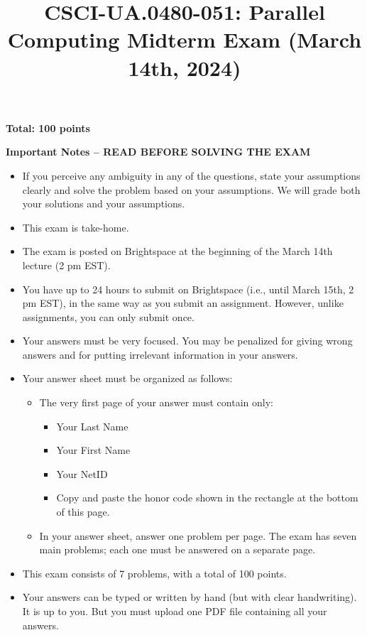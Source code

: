 \documentclass{article}
\title{CSCI-UA.0480-051: Parallel Computing Midterm Exam (March 14th, 2024)}
\author{}
\date{}
\begin{document}
\maketitle

\textbf{Total: 100 points}

\textbf{Important Notes -- READ BEFORE SOLVING THE EXAM}

\begin{itemize}
    \item If you perceive any ambiguity in any of the questions, state your assumptions clearly and solve the problem based on your assumptions. We will grade both your solutions and your assumptions.
    \item This exam is take-home.
    \item The exam is posted on Brightspace at the beginning of the March 14th lecture (2 pm EST).
    \item You have up to 24 hours to submit on Brightspace (i.e., until March 15th, 2 pm EST), in the same way as you submit an assignment. However, unlike assignments, you can only submit once.
    \item Your answers must be very focused. You may be penalized for giving wrong answers and for putting irrelevant information in your answers.
    \item Your answer sheet must be organized as follows:
    \begin{itemize}
        \item The very first page of your answer must contain only:
        \begin{itemize}
            \item Your Last Name
            \item Your First Name
            \item Your NetID
            \item Copy and paste the honor code shown in the rectangle at the bottom of this page.
        \end{itemize}
        \item In your answer sheet, answer one problem per page. The exam has seven main problems; each one must be answered on a separate page.
    \end{itemize}
    \item This exam consists of 7 problems, with a total of 100 points.
    \item Your answers can be typed or written by hand (but with clear handwriting). It is up to you. But you must upload one PDF file containing all your answers.
\end{itemize}
\end{document}

